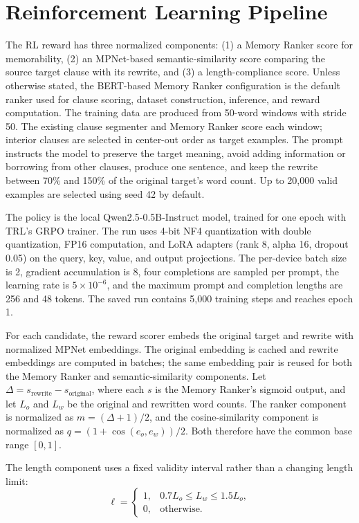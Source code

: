 \documentclass[conference]{IEEEtran}
\begin{document}
\section{Reinforcement Learning Pipeline}

The RL reward has three normalized components: (1) a Memory Ranker score for memorability, (2) an MPNet-based semantic-similarity score comparing the source target clause with its rewrite, and (3) a length-compliance score. Unless otherwise stated, the BERT-based Memory Ranker configuration is the default ranker used for clause scoring, dataset construction, inference, and reward computation. The training data are produced from 50-word windows with stride 50. The existing clause segmenter and Memory Ranker score each window; interior clauses are selected in center-out order as target examples. The prompt instructs the model to preserve the target meaning, avoid adding information or borrowing from other clauses, produce one sentence, and keep the rewrite between 70\% and 150\% of the original target's word count. Up to 20,000 valid examples are selected using seed 42 by default.

The policy is the local Qwen2.5-0.5B-Instruct model, trained for one epoch with TRL's GRPO trainer. The run uses 4-bit NF4 quantization with double quantization, FP16 computation, and LoRA adapters (rank 8, alpha 16, dropout 0.05) on the query, key, value, and output projections. The per-device batch size is 2, gradient accumulation is 8, four completions are sampled per prompt, the learning rate is $5\times10^{-6}$, and the maximum prompt and completion lengths are 256 and 48 tokens. The saved run contains 5,000 training steps and reaches epoch 1.

For each candidate, the reward scorer embeds the original target and rewrite with normalized MPNet embeddings. The original embedding is cached and rewrite embeddings are computed in batches; the same embedding pair is reused for both the Memory Ranker and semantic-similarity components. Let $\Delta=s_{\mathrm{rewrite}}-s_{\mathrm{original}}$, where each $s$ is the Memory Ranker's sigmoid output, and let $L_o$ and $L_w$ be the original and rewritten word counts. The ranker component is normalized as $m=(\Delta+1)/2$, and the cosine-similarity component is normalized as $q=(1+\cos(e_o,e_w))/2$. Both therefore have the common base range $[0,1]$.

The length component uses a fixed validity interval rather than a changing length limit:
\begin{equation}
\ell=\begin{cases}
1, & 0.7L_o\leq L_w\leq 1.5L_o,\\
0, & \text{otherwise.}
\end{cases}
\end{equation}
\end{document}
